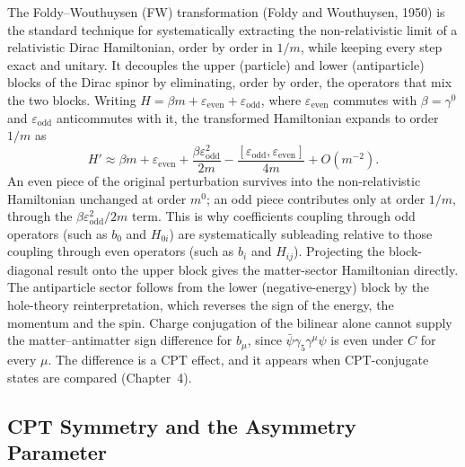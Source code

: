 The Foldy--Wouthuysen (FW) transformation (Foldy and Wouthuysen, 1950) is
the standard technique for systematically extracting the non-relativistic
limit of a relativistic Dirac Hamiltonian, order by order in $1/m$, while
keeping every step exact and unitary. It decouples the upper (particle) and
lower (antiparticle) blocks of the Dirac spinor by eliminating, order by
order, the operators that mix the two blocks. Writing
$H = \beta m + \varepsilon_{\text{even}} + \varepsilon_{\text{odd}}$, where
$\varepsilon_{\text{even}}$ commutes with $\beta=\gamma^0$ and
$\varepsilon_{\text{odd}}$ anticommutes with it, the transformed Hamiltonian
expands to order $1/m$ as
\begin{equation}
  H' \approx \beta m + \varepsilon_{\text{even}}
  + \frac{\beta\varepsilon_{\text{odd}}^2}{2m}
  - \frac{[\varepsilon_{\text{odd}},\varepsilon_{\text{even}}]}{4m}
  + O(m^{-2}). \label{eq:FWexpansion}
\end{equation}
An even piece of the original perturbation survives into the
non-relativistic Hamiltonian unchanged at order $m^0$; an odd piece
contributes only at order $1/m$, through the $\beta\varepsilon_{\text{odd}}^2/2m$
term. This is why coefficients coupling through odd operators (such as
$b_0$ and $H_{0i}$) are systematically subleading relative to those
coupling through even operators (such as $b_i$ and $H_{ij}$). Projecting
the block-diagonal result onto the upper block gives the matter-sector
Hamiltonian directly. The antiparticle sector follows from the lower
(negative-energy) block by the hole-theory reinterpretation, which reverses
the sign of the energy, the momentum and the spin. Charge conjugation of
the bilinear alone cannot supply the matter--antimatter sign difference for
$b_\mu$, since $\bar\psi\gamma_5\gamma^\mu\psi$ is even under $C$ for every
$\mu$. The difference is a CPT effect, and it appears when CPT-conjugate
states are compared (Chapter~4).

\subsection{CPT Symmetry and the Asymmetry Parameter}
\label{sec:asymmetry-def}

